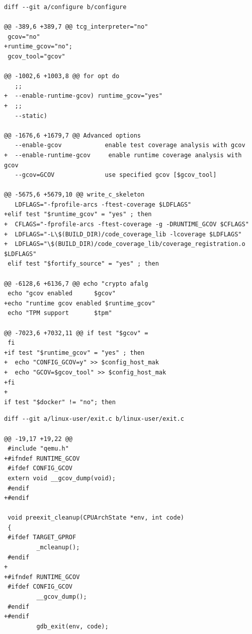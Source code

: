 \documentclass[12pt,oneside]{memoir}
\newcommand{\strano}[1]{\textit{#1}}
\begin{document}
\begin{lstlisting}[caption={Izmene skripte \strano{configure}},frame=single, label=qemu-diff-1]
diff --git a/configure b/configure

@@ -389,6 +389,7 @@ tcg_interpreter="no"
 gcov="no"
+runtime_gcov="no";
 gcov_tool="gcov"

@@ -1002,6 +1003,8 @@ for opt do
   ;;
+  --enable-runtime-gcov) runtime_gcov="yes"
+  ;;
   --static)

@@ -1676,6 +1679,7 @@ Advanced options 
   --enable-gcov            enable test coverage analysis with gcov
+  --enable-runtime-gcov     enable runtime coverage analysis with gcov
   --gcov=GCOV              use specified gcov [$gcov_tool]

@@ -5675,6 +5679,10 @@ write_c_skeleton
   LDFLAGS="-fprofile-arcs -ftest-coverage $LDFLAGS"
+elif test "$runtime_gcov" = "yes" ; then
+  CFLAGS="-fprofile-arcs -ftest-coverage -g -DRUNTIME_GCOV $CFLAGS"
+  LDFLAGS="-L\$(BUILD_DIR)/code_coverage_lib -lcoverage $LDFLAGS"
+  LDFLAGS="\$(BUILD_DIR)/code_coverage_lib/coverage_registration.o $LDFLAGS"
 elif test "$fortify_source" = "yes" ; then
 
@@ -6128,6 +6136,7 @@ echo "crypto afalg      
 echo "gcov enabled      $gcov"
+echo "runtime gcov enabled $runtime_gcov"
 echo "TPM support       $tpm"

@@ -7023,6 +7032,11 @@ if test "$gcov" = 
 fi
+if test "$runtime_gcov" = "yes" ; then
+  echo "CONFIG_GCOV=y" >> $config_host_mak
+  echo "GCOV=$gcov_tool" >> $config_host_mak
+fi
+
if test "$docker" != "no"; then
\end{lstlisting}

\newpage
\begin{lstlisting}[caption={Izmene fajla \strano{linux-user/exit.c}},frame=single, label=qemu-diff-2]
diff --git a/linux-user/exit.c b/linux-user/exit.c

@@ -19,17 +19,22 @@
 #include "qemu.h"
+#ifndef RUNTIME_GCOV
 #ifdef CONFIG_GCOV
 extern void __gcov_dump(void);
 #endif
+#endif
 
 void preexit_cleanup(CPUArchState *env, int code)
 {
 #ifdef TARGET_GPROF
         _mcleanup();
 #endif
+
+#ifndef RUNTIME_GCOV
 #ifdef CONFIG_GCOV
         __gcov_dump();
 #endif
+#endif
         gdb_exit(env, code);
\end{lstlisting}
\end{document}
